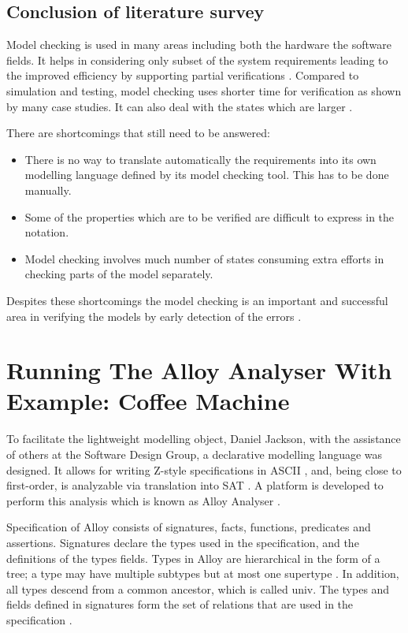 \documentclass[a4paper,10pt]{report}
\begin{document}
\section{Conclusion of literature survey}
\label{conclude literature survey}

Model checking is used in many areas including both the hardware the software fields. It helps in considering only subset of the system requirements leading to the improved efficiency by supporting partial verifications \cite{Palshikar2004}. Compared to simulation and testing, model checking uses shorter time for verification as shown by many case studies. It can also deal with the states which are larger \cite{Palshikar2004}.

There are shortcomings that still need to be answered:
\begin{itemize}
\item There is no way to translate automatically the requirements into its own modelling language defined by its model checking tool. This has to be done manually.
\item Some of the properties which are to be verified are difficult to express in the notation.
\item Model checking involves much number of states consuming extra efforts in checking parts of the model separately. 
\end{itemize}
Despites these shortcomings the model checking is an important and successful area in verifying the models by early detection of the errors \cite{Havelund}.

\chapter{Running The Alloy Analyser With Example: Coffee Machine}

To facilitate the lightweight modelling object, Daniel Jackson, with the assistance of others at the Software Design Group, a declarative modelling language was designed. It allows for writing Z-style specifications in ASCII \cite{J.M.Spivey1989}, and, being close to first-order, is analyzable via translation into SAT . A platform is developed to perform this analysis which is known as Alloy Analyser \cite{Yeung2005}.

Specification of Alloy consists of signatures, facts, functions, predicates and assertions. Signatures declare the types used in the specification, and the definitions of the types fields. Types in Alloy are hierarchical in the form of a tree; a type may have multiple subtypes but at most one supertype \cite{JonathanEdwards}. In addition, all types descend from a common ancestor, which is called univ. The types and fields defined in signatures form the set of relations that are used in the specification \cite{Yeung2005}.
\end{document}
